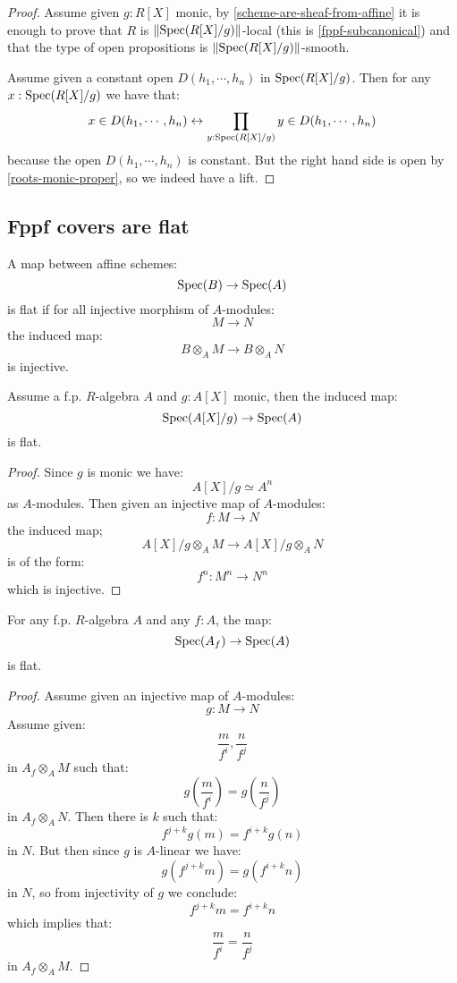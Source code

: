 \begin{proof}
Assume given $g:R[X]$ monic, by \cref{scheme-are-sheaf-from-affine} it is enough to prove that $R$ is $\lVert \operatorname{Spec}(R[X]/g) \rVert$-local (this is \cref{fppf-subcanonical}) and that the type of open propositions is $\lVert \operatorname{Spec}(R[X]/g) \rVert$-smooth. 

Assume given a constant open $D(h_1,\cdots,h_n)$ in $\operatorname{Spec}(R[X]/g)$. Then for any $x:\operatorname{Spec}(R[X]/g)$ we have that:
\[x\in D(h_1,\cdots,h_n) \leftrightarrow \prod_{y:\operatorname{Spec}(R[X]/g)} y\in D(h_1,\cdots,h_n)\]
because the open $D(h_1,\cdots,h_n)$ is constant. But the right hand side is open by \cref{roots-monic-proper}, so we indeed have a lift.
\end{proof}

\subsection{Fppf covers are flat}

\begin{definition}
A map between affine schemes:
\[\operatorname{Spec}(B)\to \operatorname{Spec}(A)\]
is flat if for all injective morphism of $A$-modules: 
\[M\to N\]
the induced map:
\[B\otimes_A M \to B\otimes_A N\]
is injective.
\end{definition}

\begin{lemma}\label{root-monic-flat}
Assume a f.p. $R$-algebra $A$ and $g:A[X]$ monic, then the induced map:
\[\operatorname{Spec}(A[X]/g)\to \operatorname{Spec}(A)\]
is flat.
\end{lemma}

\begin{proof}
Since $g$ is monic we have:
\[A[X]/g\simeq A^n\]
as $A$-modules. Then given an injective map of $A$-modules:
\[f:M\to N\]
the induced map;
\[A[X]/g\otimes_AM \to A[X]/g\otimes_AN\]
is of the form:
\[f^n:M^n\to N^n\]
which is injective.
\end{proof}

\begin{lemma}\label{localisation-is-flat}
For any f.p. $R$-algebra $A$ and any $f:A$, the map:
\[\operatorname{Spec}(A_f)\to\operatorname{Spec}(A)\]
is flat.
\end{lemma}

\begin{proof}
Assume given an injective map of $A$-modules:
\[g:M\to N\]
Assume given:
\[\frac{m}{f^i},\frac{n}{f^j}\]
in $A_f\otimes_AM$ such that:
\[g(\frac{m}{f^i}) = g(\frac{n}{f^j})\]
in $A_f\otimes_AN$. Then there is $k$ such that:
\[f^{j+k}g(m) = f^{i+k}g(n)\]
in $N$. But then since $g$ is $A$-linear we have:
\[g(f^{j+k}m) = g(f^{i+k}n)\]
in $N$, so from injectivity of $g$ we conclude:
\[f^{j+k}m = f^{i+k}n\]
which implies that:
\[\frac{m}{f^i} = \frac{n}{f^j}\]
in $A_f\otimes_AM$.
\end{proof}

